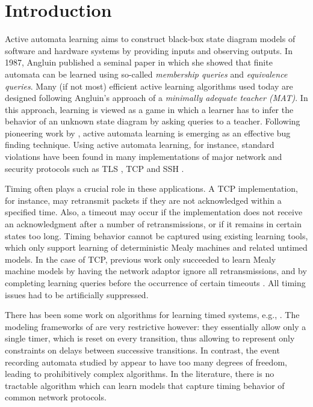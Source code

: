 \section{Introduction}
\label{sec:intro}

Active automata learning aims to construct black-box state diagram models of software and hardware systems
by providing inputs and observing outputs.
In 1987, Angluin \cite{Ang87} published a seminal paper in which she showed that finite automata can be learned using so-called 
\emph{membership queries} and \emph{equivalence queries}.
Many (if not most) efficient active learning algorithms used
today are designed following Angluin's approach of a \emph{minimally adequate teacher (MAT)}.
In this approach, learning is viewed as a game in which a learner has to infer the behavior of
an unknown state diagram by asking queries to a teacher.
Following pioneering work by \cite{Ang87,PeVaYa02,Hagerer2002,RaMeSM2009,IsHoSt2015},
active automata learning is emerging as an effective bug finding technique.
Using active automata learning, for instance, standard violations have been found in many implementations of
major network and security protocols such as TLS \cite{dRP15}, TCP \cite{FJV16,FH17} and SSH \cite{FiterauEtAl17}.

Timing often plays a crucial role in these applications.
A TCP implementation, for instance, may retransmit packets if they are not acknowledged within
a specified time. Also, a timeout may occur if the implementation does not receive an acknowledgment
after a number of retransmissions, or if it remains in certain states too long.
Timing behavior cannot be captured using existing learning tools, which only support learning of deterministic
Mealy machines and related untimed models.
In the case of TCP, previous work only succeeded to learn Mealy machine models by having the network adaptor 
ignore all retransmissions, and by completing learning queries before the occurrence of certain timeouts \cite{FJV16}.
All timing issues had to be artificially suppressed.

There has been some work on algorithms for learning timed systems, e.g., \cite{GrinchteinJP06,GrinchteinJL10,CCF16,VWW:rti}.
The modeling frameworks of \cite{VWW:rti,CCF16} are very restrictive however: they essentially allow only a single timer, which is reset on every transition,
thus allowing to represent only constraints on delays between successive transitions. In contrast, the event recording automata studied by \cite{GrinchteinJP06,GrinchteinJL10} appear to have too many degrees of freedom, leading to
prohibitively complex algorithms.
In the literature, there is no tractable algorithm which can learn models that
capture timing behavior of common network protocols.

